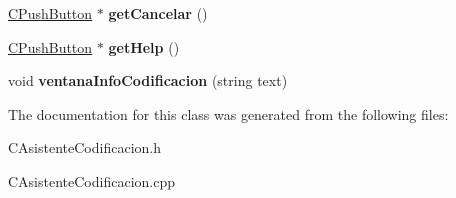 \begin{DoxyCompactItemize}
\item 
\hyperlink{classCPushButton}{C\+Push\+Button} $\ast$ {\bfseries get\+Cancelar} ()\hypertarget{classCAsistenteCodificacion_a4e1025d9e7c189d22a19d97474499ceb}{}\label{classCAsistenteCodificacion_a4e1025d9e7c189d22a19d97474499ceb}

\item 
\hyperlink{classCPushButton}{C\+Push\+Button} $\ast$ {\bfseries get\+Help} ()\hypertarget{classCAsistenteCodificacion_adf9ae1bf08b445fb095246b95b723450}{}\label{classCAsistenteCodificacion_adf9ae1bf08b445fb095246b95b723450}

\item 
void {\bfseries ventana\+Info\+Codificacion} (string text)\hypertarget{classCAsistenteCodificacion_a8d5a01cef945d9a6b72dd54a9aaecec2}{}\label{classCAsistenteCodificacion_a8d5a01cef945d9a6b72dd54a9aaecec2}

\end{DoxyCompactItemize}


The documentation for this class was generated from the following files\+:\begin{DoxyCompactItemize}
\item 
C\+Asistente\+Codificacion.\+h\item 
C\+Asistente\+Codificacion.\+cpp\end{DoxyCompactItemize}
